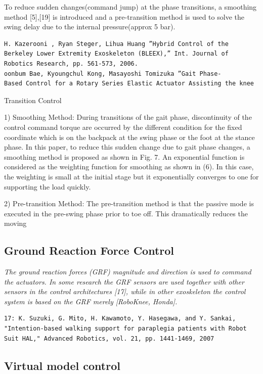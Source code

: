 \documentclass[letterpaper,12pt,fullpage]{article}
\begin{document}
To reduce
sudden changes(command jump) at the phase transitions, a
smoothing method [5],[19] is introduced and a pre-transition
method is used to solve the swing delay due to the internal
pressure(approx 5 bar).
\begin{verbatim}
H. Kazerooni , Ryan Steger, Lihua Huang ”Hybrid Control of the
Berkeley Lower Extremity Exoskeleton (BLEEX),” Int. Journal of
Robotics Research, pp. 561-573, 2006.
oonbum Bae, Kyoungchul Kong, Masayoshi Tomizuka ”Gait Phase-
Based Control for a Rotary Series Elastic Actuator Assisting the knee
\end{verbatim}

Transition Control

1) Smoothing Method: During transitions of the gait
phase, discontinuity of the control command torque are
occurred by the different condition for the fixed coordinate
which is on the backpack at the swing phase or the foot at
the stance phase. In this paper, to reduce this sudden change
due to gait phase changes, a smoothing method is proposed
as shown in Fig. 7. An exponential function is considered
as the weighting function for smoothing as shown in (6).
In this case, the weighting is small at the initial stage but
it exponentially converges to one for supporting the load
quickly.

2) Pre-transition Method: The pre-transition method is
that the passive mode is executed in the pre-swing phase
prior to toe off. This dramatically reduces the moving

\subsection{Ground Reaction Force Control}

{\it
The ground reaction
forces (GRF) magnitude and direction is used to command the
actuators. In some research the GRF sensors are used
together with other sensors in the control architectures [17],
while in other exoskeleton the control system is based on the
GRF merely [RoboKnee, Honda].
}
\begin{verbatim}
17: K. Suzuki, G. Mito, H. Kawamoto, Y. Hasegawa, and Y. Sankai,
"Intention-based walking support for paraplegia patients with Robot
Suit HAL," Advanced Robotics, vol. 21, pp. 1441-1469, 2007
\end{verbatim}

\subsection{Virtual model control}
\end{document}
